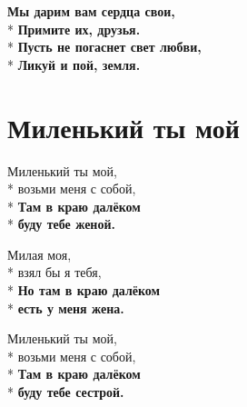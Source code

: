 \medskip

\begin{minipage}{\linewidth}
\hspace*{1.5em}\textbf{Мы дарим вам сердца свои,}\\*
\hspace*{1.5em}\textbf{Примите их, друзья.}\\*
\hspace*{1.5em}\textbf{Пусть не погаснет свет любви,}\\*
\hspace*{1.5em}\textbf{Ликуй и пой, земля.}\\
\end{minipage}

\vspace{\fill}\newpage

\section{Миленький ты мой}
\label{song:Миленький_ты_мой}

\medskip

\begin{minipage}{\linewidth}
Миленький ты мой,\\*
возьми меня с собой,\\*
\textbf{Там в краю далёком}\\*
\textbf{буду тебе женой.}\\
\end{minipage}\par\medskip\nobreak

\medskip

\begin{minipage}{\linewidth}
Милая моя,\\*
взял бы я тебя,\\*
\textbf{Но там в краю далёком}\\*
\textbf{есть у меня жена.}\\
\end{minipage}\par\medskip\nobreak

\medskip

\begin{minipage}{\linewidth}
Миленький ты мой,\\*
возьми меня с собой,\\*
\textbf{Там в краю далёком}\\*
\textbf{буду тебе сестрой.}\\
\end{minipage}\par\medskip\nobreak

